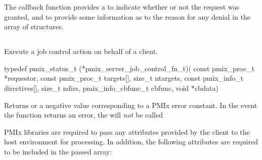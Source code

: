 The callback function provides a  to indicate whether or not the request was granted, and to provide some information as to the reason for any denial in the  array of  structures.


\subsection{}

\summary

Execute a job control action on behalf of a client.

\format

\cspecificstart
\begin{codepar}
typedef pmix_status_t (*pmix_server_job_control_fn_t)(
                             const pmix_proc_t *requestor,
                             const pmix_proc_t targets[], size_t ntargets,
                             const pmix_info_t directives[], size_t ndirs,
                             pmix_info_cbfunc_t cbfunc, void *cbdata)
\end{codepar}
\cspecificend

\begin{arglist}
\end{arglist}

Returns  or a negative value corresponding to a PMIx error constant. In the event the function returns an error, the  will \textit{not} be called

\reqattrstart
\ac{PMIx} libraries are required to pass any attributes provided by the client to the host environment for processing. In addition, the following attributes are required to be included in the passed  array:


